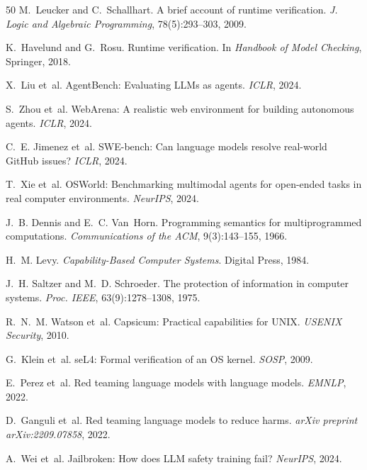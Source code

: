 \begin{thebibliography}{50}
M.~Leucker and C.~Schallhart.
\newblock A brief account of runtime verification.
\newblock \emph{J. Logic and Algebraic Programming}, 78(5):293--303, 2009.

K.~Havelund and G.~Rosu.
\newblock Runtime verification.
\newblock In \emph{Handbook of Model Checking}, Springer, 2018.

X.~Liu et~al.
\newblock AgentBench: Evaluating LLMs as agents.
\newblock \emph{ICLR}, 2024.

S.~Zhou et~al.
\newblock WebArena: A realistic web environment for building autonomous agents.
\newblock \emph{ICLR}, 2024.

C.~E. Jimenez et~al.
\newblock SWE-bench: Can language models resolve real-world GitHub issues?
\newblock \emph{ICLR}, 2024.

T.~Xie et~al.
\newblock OSWorld: Benchmarking multimodal agents for open-ended tasks in real computer environments.
\newblock \emph{NeurIPS}, 2024.

J.~B. Dennis and E.~C. Van~Horn.
\newblock Programming semantics for multiprogrammed computations.
\newblock \emph{Communications of the ACM}, 9(3):143--155, 1966.

H.~M. Levy.
\newblock \emph{Capability-Based Computer Systems}.
\newblock Digital Press, 1984.

J.~H. Saltzer and M.~D. Schroeder.
\newblock The protection of information in computer systems.
\newblock \emph{Proc. IEEE}, 63(9):1278--1308, 1975.

R.~N.~M. Watson et~al.
\newblock Capsicum: Practical capabilities for UNIX.
\newblock \emph{USENIX Security}, 2010.

G.~Klein et~al.
\newblock seL4: Formal verification of an OS kernel.
\newblock \emph{SOSP}, 2009.

E.~Perez et~al.
\newblock Red teaming language models with language models.
\newblock \emph{EMNLP}, 2022.

D.~Ganguli et~al.
\newblock Red teaming language models to reduce harms.
\newblock \emph{arXiv preprint arXiv:2209.07858}, 2022.

A.~Wei et~al.
\newblock Jailbroken: How does LLM safety training fail?
\newblock \emph{NeurIPS}, 2024.


\end{thebibliography}
